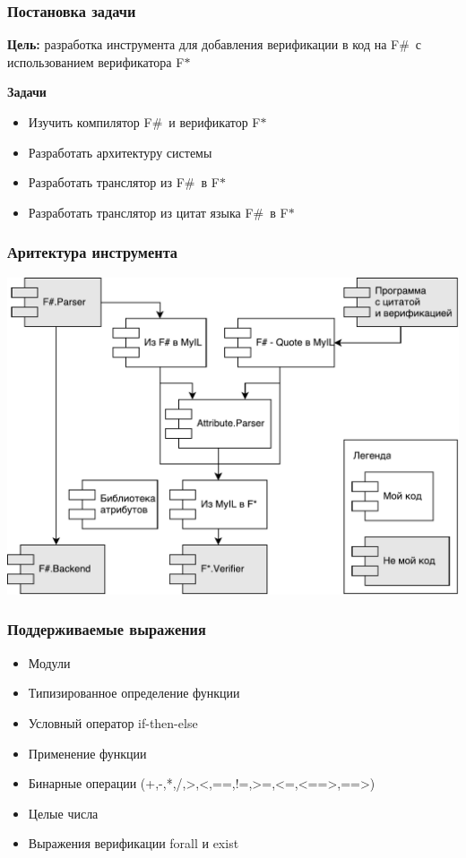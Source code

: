 \documentclass{beamer}
\def \fstar {F$\ast$}
\def \fsharp {F$\#$}
\begin{document}
\begin{frame}
  \transwipe[direction=90]
  \frametitle{Постановка задачи}
  \textbf{Цель:} разработка инструмента для добавления верификации в код на \fsharp~с использованием верификатора \fstar
  
  \textbf{Задачи}
  \begin{itemize}
    \item Изучить компилятор \fsharp~и верификатор \fstar
    \item Разработать архитектуру системы
    \item Разработать транслятор из \fsharp~в \fstar
    \item Разработать транслятор из цитат языка \fsharp~в \fstar
  \end{itemize}
  
\end{frame}

\begin{frame}
  \transwipe[direction=90]
  \frametitle{Аритектура инструмента}
  \center
  \includegraphics[width=0.9\linewidth]{Teh}
\end{frame}

\begin{frame}[fragile]
  \transwipe[direction=90]
  \frametitle{Поддерживаемые выражения}
  \begin{itemize}
    \item Модули
    \item Типизированное определение функции
    \item Условный оператор if-then-else
    \item Применение функции
    \item Бинарные операции (+,-,*,/,>,<,==,!=,>=,<=,<==>,==>)
    \item Целые числа
    \item Выражения верификации forall и exist
  \end{itemize}
\end{frame}
\end{document}

